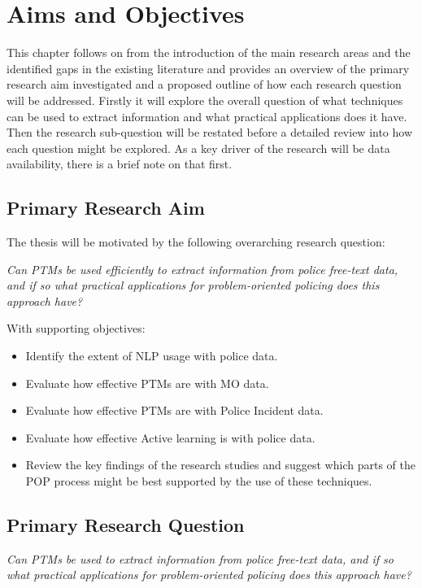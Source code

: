 \chapter{Aims and Objectives} This chapter follows on from the introduction of the main research areas and the identified gaps in the existing literature and provides an overview of the primary research aim investigated and a proposed outline of how each research question will be addressed. Firstly it will explore the overall question of what techniques can be used to extract information and  what practical applications does it have. Then the research sub-question will be restated before a detailed review into how each question might be explored.  As a key driver of the research will be data availability, there is a brief note on that first.

\section{Primary Research Aim}
The thesis will be motivated by the following overarching research question: 

\emph{Can PTMs be used efficiently to extract information from police free-text data, and if so what practical applications for problem-oriented policing does this approach have?}

With supporting objectives:
\begin{itemize}
\item Identify the extent of NLP usage with police data.

\item Evaluate how effective PTMs are with MO data.

\item Evaluate how effective PTMs are with Police Incident data.

\item Evaluate how effective Active learning is with police data.

\item Review the key findings of the research studies and suggest which parts of the POP process might be best supported by the use of these techniques.

\end{itemize}

\section{Primary Research Question}

\emph{Can PTMs be used to extract information from police free-text data, and if so what practical applications for problem-oriented policing does this approach have?}

